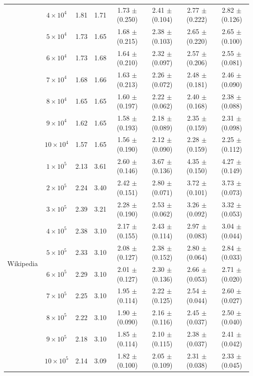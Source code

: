 \documentclass[10pt,journal,compsoc]{IEEEtran}
\newcommand{\Wikipedia}{{\sf Wikipedia}\xspace}
\begin{document}
\begin{table}
\begin{tabular}{c|c|c|c|c|c|c|c}
 & $4 \times 10^4 $ & 1.81 & 1.71 & 1.73 $\pm$ (0.250) & 2.41 $\pm$ (0.104) & 2.77 $\pm$ (0.222) & 2.82 $\pm$ (0.126) \\
 & $5 \times 10^4 $ & 1.73 & 1.65 & 1.68 $\pm$ (0.215) & 2.38 $\pm$ (0.103) & 2.65 $\pm$ (0.220) & 2.65 $\pm$ (0.100)  \\
 & $6 \times 10^4 $ & 1.73 & 1.68 & 1.64 $\pm$ (0.210) & 2.32 $\pm$ (0.097) & 2.57 $\pm$ (0.206) & 2.55 $\pm$ (0.081)  \\
 & $7 \times 10^4 $ & 1.68 & 1.66 & 1.63 $\pm$ (0.213) & 2.26 $\pm$ (0.072) & 2.48 $\pm$ (0.181) & 2.46 $\pm$ (0.090)  \\
 & $8 \times 10^4 $ & 1.65 & 1.65 & 1.60 $\pm$ (0.197) & 2.22 $\pm$ (0.062) & 2.40 $\pm$ (0.168) & 2.38 $\pm$ (0.088)  \\
 & $9 \times 10^4 $ & 1.62 & 1.65 & 1.58 $\pm$ (0.193) & 2.18 $\pm$ (0.089) & 2.35 $\pm$ (0.159) & 2.31 $\pm$ (0.098)  \\
 & $10 \times 10^4 $ & 1.57 & 1.65 & 1.56 $\pm$ (0.190) & 2.12 $\pm$ (0.090) & 2.28 $\pm$ (0.159) & 2.25 $\pm$ (0.112)  \\
\hline
\multirow{10}{*}{\Wikipedia}
 & $1 \times 10^5 $ & 2.13 & 3.61 & 2.60 $\pm$ (0.146) & 3.67 $\pm$ (0.136) & 4.35 $\pm$ (0.150) & 4.27 $\pm$ (0.149)  \\
 & $2 \times 10^5 $ & 2.24 & 3.40 & 2.42 $\pm$ (0.151) & 2.80 $\pm$ (0.071) & 3.72 $\pm$ (0.101) & 3.73 $\pm$ (0.073)  \\
 & $3 \times 10^5 $ & 2.39 & 3.21 & 2.28 $\pm$ (0.190) & 2.53 $\pm$ (0.062) & 3.26 $\pm$ (0.092) & 3.32 $\pm$ (0.053)  \\
 & $4 \times 10^5 $ & 2.38 & 3.10 & 2.17 $\pm$ (0.155) & 2.43 $\pm$ (0.114) & 2.97 $\pm$ (0.083) & 3.04 $\pm$ (0.044) \\
 & $5 \times 10^5 $ & 2.33 & 3.10 & 2.08 $\pm$ (0.127) & 2.38 $\pm$ (0.152) & 2.80 $\pm$ (0.064) & 2.84 $\pm$ (0.033)  \\
 & $6 \times 10^5 $ & 2.29 & 3.10 & 2.01 $\pm$ (0.127) & 2.30 $\pm$ (0.136) & 2.66 $\pm$ (0.053) & 2.71 $\pm$ (0.020)  \\
 & $7 \times 10^5 $ & 2.25 & 3.10 & 1.95 $\pm$ (0.114) & 2.22 $\pm$ (0.125) & 2.54 $\pm$ (0.044) & 2.60 $\pm$ (0.027)  \\
 & $8 \times 10^5 $ & 2.22 & 3.10 & 1.90 $\pm$ (0.090) & 2.16 $\pm$ (0.116) & 2.45 $\pm$ (0.037) & 2.50 $\pm$ (0.040)  \\
 & $9 \times 10^5 $ & 2.18 & 3.10 & 1.85 $\pm$ (0.114) & 2.10 $\pm$ (0.115) & 2.38 $\pm$ (0.037) & 2.41 $\pm$ (0.042)  \\
 & $10 \times 10^5 $ & 2.14 & 3.09 & 1.82 $\pm$ (0.100) & 2.05 $\pm$ (0.109) & 2.31 $\pm$ (0.038) & 2.33 $\pm$ (0.045)  \\
\hline \hline
\end{tabular}
\vspace{-2ex}
\end{table}
\end{document}
